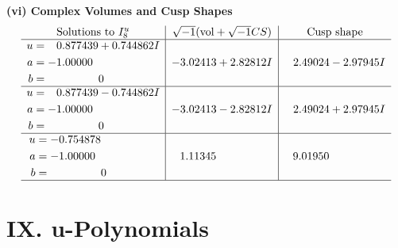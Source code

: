 \documentclass[1p]{elsarticle_modified}
\theoremstyle{definition}
\newcommand{\I}{\sqrt{-1}}
\begin{document}
\newpage\flushleft \textbf{(vi) Complex Volumes and Cusp Shapes}
$$\begin{array}{c|c|c}  
\text{Solutions to }I^u_{8}& \I (\text{vol} + \sqrt{-1}CS) & \text{Cusp shape}\\
 \hline 
\begin{aligned}
u &= \phantom{-}0.877439 + 0.744862 I \\
a &= -1.00000\phantom{ +0.000000I} \\
b &= \phantom{-0.000000 } 0\end{aligned}
 & -3.02413 + 2.82812 I & \phantom{-}2.49024 - 2.97945 I \\ \hline\begin{aligned}
u &= \phantom{-}0.877439 - 0.744862 I \\
a &= -1.00000\phantom{ +0.000000I} \\
b &= \phantom{-0.000000 } 0\end{aligned}
 & -3.02413 - 2.82812 I & \phantom{-}2.49024 + 2.97945 I \\ \hline\begin{aligned}
u &= -0.754878\phantom{ +0.000000I} \\
a &= -1.00000\phantom{ +0.000000I} \\
b &= \phantom{-0.000000 } 0\end{aligned}
 & \phantom{-}1.11345\phantom{ +0.000000I} & \phantom{-}9.01950\phantom{ +0.000000I}\\
 \hline 
 \end{array}$$\newpage
\newpage\renewcommand{\arraystretch}{1}
\centering \section*{ IX. u-Polynomials}
\end{document}
